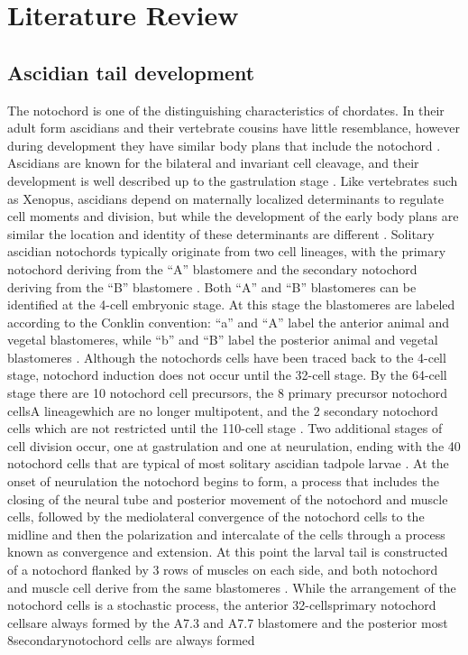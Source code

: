 \chapter{Literature Review}
\section{Ascidian tail development}

The notochord is one of the distinguishing characteristics of chordates. In their adult form ascidians and their vertebrate cousins have little resemblance, however during development they have similar body plans that include the notochord \cite{jeffery_minireview_2002}. Ascidians are known for the bilateral and invariant cell cleavage, and their development is well described up to the gastrulation stage \cite{nishida_cell_1983,nishida_cell_1985,nishida_cell_1987}. Like vertebrates such as Xenopus, ascidians depend on maternally localized determinants to regulate cell moments and division, but while the development of the early body plans are similar the location and identity of these determinants are different \cite{lemaire_ascidians_2008}. Solitary ascidian notochords typically originate from two cell lineages, with the primary notochord deriving from the ``A'' blastomere and the secondary notochord deriving from the ``B'' blastomere \cite{nishida_cell_1983}.  Both ``A'' and ``B'' blastomeres can be identified at the 4-cell embryonic stage. At this stage the blastomeres are labeled according to the Conklin convention: ``a'' and ``A'' label the anterior animal and vegetal blastomeres, while ``b'' and ``B'' label the posterior animal and vegetal blastomeres \cite{conklin_organization_1905} . Although the notochords cells have been traced back to the 4-cell stage, notochord induction does not occur until the 32-cell stage. By the 64-cell stage there are 10 notochord cell precursors, the 8 primary precursor notochord cells\textemdash A lineage\textemdash which are no longer multipotent, and the 2 secondary notochord cells which are not restricted until the 110-cell stage \cite{nishida_cell_1985,yasuo_ascidian_1994,yasuo_conservation_1998,lemaire_unfolding_2009}. Two additional stages of cell division occur, one at gastrulation and one at neurulation, ending with the 40 notochord cells that are typical of most solitary ascidian tadpole larvae \cite{conklin_organization_1905}. At the onset of neurulation the notochord begins to form, a process that includes the closing of the neural tube and posterior movement of the notochord and muscle cells, followed by the mediolateral convergence of the notochord cells to the midline and then the polarization and intercalate of the cells through a process known as convergence and extension\cite{swalla_mechanisms_1993}. At this point the larval tail is constructed of a notochord flanked by 3 rows of muscles on each side, and both notochord and muscle cell derive from the same blastomeres \cite{nishida_cell_1985}. While the arrangement of the notochord cells is a stochastic process, the anterior 32-cells\textemdash primary notochord cells\textemdash are always formed by the A7.3 and A7.7 blastomere and the posterior most 8\textemdash secondary\textemdash notochord cells are always formed 